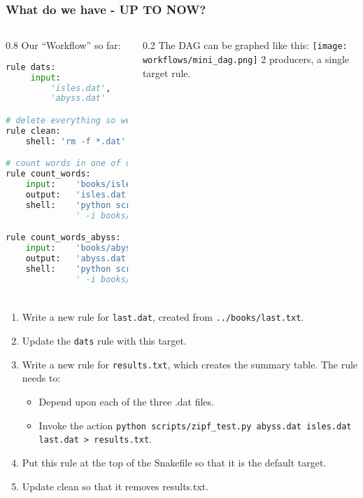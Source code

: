 \begin{frame}[fragile]
  \frametitle{What do we have - UP TO NOW?}
  \begin{columns}
   \begin{column}{0.8\textwidth}
     Our ``Workflow'' so far:
     \begin{lstlisting}[language=Python,style=Python, basicstyle=\tiny]
rule dats:
     input:
         'isles.dat',
         'abyss.dat'

# delete everything so we can re-run things
rule clean:
    shell: 'rm -f *.dat'

# count words in one of our "books"
rule count_words:
    input:    'books/isles.txt'
    output:   'isles.dat'
    shell:    'python scripts/wordcount.py'
              ' -i books/isles.txt -o isles.dat'

rule count_words_abyss:
    input:    'books/abyss.txt'
    output:   'abyss.dat'
    shell:    'python scripts/wordcount.py' 
              ' -i books/abyss.txt -o abyss.dat'     
     \end{lstlisting}

   \end{column}
   
   \begin{column}{0.2\textwidth}
     The DAG can be graphed like this:
     \texttt{[image: workflows/mini\_dag.png]}
     2 producers, a single target rule.
   \end{column}
  \end{columns}
\end{frame}

\begin{frame}[fragile]
  \frametitle{}
  \begin{enumerate}
   \item Write a new rule for \texttt{last.dat}, created from \texttt{../books/last.txt}.
   \item Update the \texttt{dats} rule with this target.
   \item Write a new rule for \texttt{results.txt}, which creates the summary table. The rule needs to:
        \begin{itemize}
         \item Depend upon each of the three .dat files.
         \item Invoke the action \texttt{python scripts/zipf\_test.py abyss.dat isles.dat last.dat > results.txt}.
        \end{itemize}
   \item Put this rule at the top of the Snakefile so that it is the default target.
   \item Update clean so that it removes results.txt.
  \end{enumerate}
\end{frame}


  

